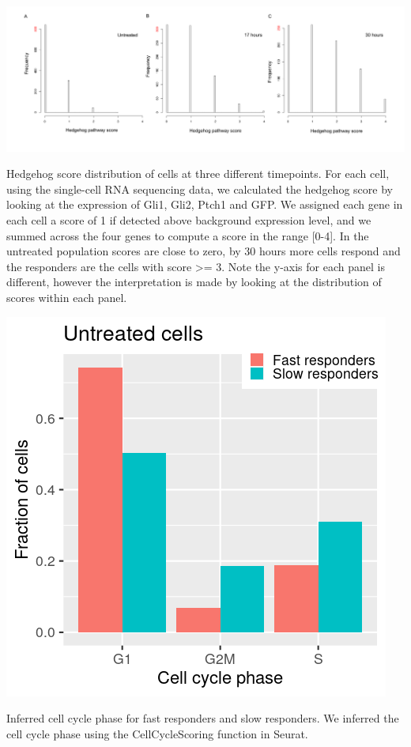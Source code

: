 \begin{suppfigure}[p]  
    \centering
    \includegraphics[width=\linewidth]{figures/hedgehog/SuppFigure7.png}
    \caption[Hedgehog score distribution at the 0, 17 and 30 hour time-points]{
        Hedgehog score distribution of cells at three different timepoints. For each cell, using the single-cell RNA sequencing data, we calculated the hedgehog score by looking at the expression of Gli1, Gli2, Ptch1 and GFP.  We assigned each gene in each cell a score of 1 if detected above background expression level, and we summed across the four genes to compute a score in the range [0-4]. In the untreated population scores are close to zero, by 30 hours more cells respond and the responders are the cells with score >= 3. Note the y-axis for each panel is different, however the interpretation is made by looking at the distribution of scores within each panel.  
    }
    \label{fig:hh_figureS7}
\end{suppfigure}


\begin{suppfigure}[p]  
    \centering
    \includegraphics[width=\linewidth]{figures/hedgehog/SuppFigure8.png}
    \caption[Cell cycle assignments for fast responders and slow responders]{
        Inferred cell cycle phase for fast responders and slow responders. We inferred the cell cycle phase using the CellCycleScoring function in Seurat. 
    }
    \label{fig:hh_figureS8}
\end{suppfigure}


